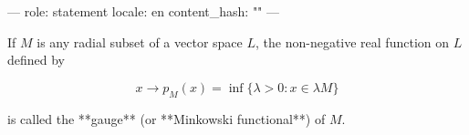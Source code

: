 ---
role: statement
locale: en
content_hash: ""
---

If $M$ is any radial subset of a vector space $L$, the non-negative real function on $L$ defined by

$$x \rightarrow p_M(x) = \inf \{ \lambda > 0 : x \in \lambda M \}$$

is called the **gauge** (or **Minkowski functional**) of $M$.
